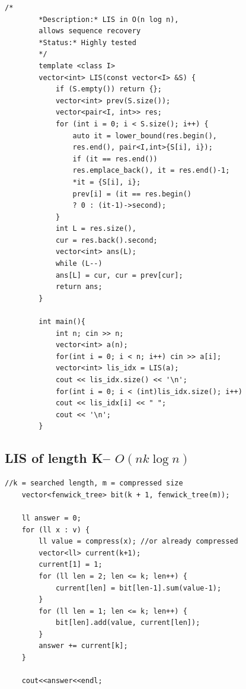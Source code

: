 \documentclass[10pt,a4paper,twocolumn]{article}
\begin{document}
	\begin{lstlisting}[style=cpp, title={LIS.cpp}]
		/*
		*Description:* LIS in O(n log n),
		allows sequence recovery
		*Status:* Highly tested
		*/
		template <class I>
		vector<int> LIS(const vector<I> &S) {
			if (S.empty()) return {};
			vector<int> prev(S.size());
			vector<pair<I, int>> res;
			for (int i = 0; i < S.size(); i++) {
				auto it = lower_bound(res.begin(),
				res.end(), pair<I,int>{S[i], i});
				if (it == res.end())
				res.emplace_back(), it = res.end()-1;
				*it = {S[i], i};
				prev[i] = (it == res.begin()
				? 0 : (it-1)->second);
			}
			int L = res.size(),
			cur = res.back().second;
			vector<int> ans(L);
			while (L--)
			ans[L] = cur, cur = prev[cur];
			return ans;
		}
		
		int main(){
			int n; cin >> n;
			vector<int> a(n);
			for(int i = 0; i < n; i++) cin >> a[i];
			vector<int> lis_idx = LIS(a);
			cout << lis_idx.size() << '\n';
			for(int i = 0; i < (int)lis_idx.size(); i++)
			cout << lis_idx[i] << " ";
			cout << '\n';
		}
	\end{lstlisting}
	
	\subsection{LIS of length K-- $O(nk \log n)$}
	\begin{lstlisting}[style=cpp, title={LIS$\_$lenght$\_$k.cpp}]
    //k = searched length, m = compressed size
    vector<fenwick_tree> bit(k + 1, fenwick_tree(m));

    ll answer = 0;
    for (ll x : v) {
        ll value = compress(x); //or already compressed
        vector<ll> current(k+1);
        current[1] = 1;
        for (ll len = 2; len <= k; len++) {
            current[len] = bit[len-1].sum(value-1);
        }
        for (ll len = 1; len <= k; len++) {
            bit[len].add(value, current[len]);
        }
        answer += current[k];
    }

    cout<<answer<<endl;
	\end{lstlisting}
	
\end{document}

